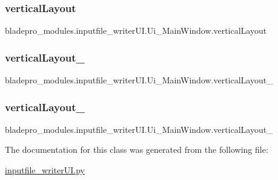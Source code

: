 \subsubsection{\texorpdfstring{vertical\+Layout}{verticalLayout}}
{\footnotesize\ttfamily bladepro\+\_\+modules.\+inputfile\+\_\+writer\+U\+I.\+Ui\+\_\+\+Main\+Window.\+vertical\+Layout}

\hypertarget{classbladepro__modules_1_1inputfile__writer_u_i_1_1_ui___main_window_af6dda5301b2c18cc6cb517d406371cd8}{}\label{classbladepro__modules_1_1inputfile__writer_u_i_1_1_ui___main_window_af6dda5301b2c18cc6cb517d406371cd8} 
\subsubsection{\texorpdfstring{vertical\+Layout\+\_}{verticalLayout\_2}}
{\footnotesize\ttfamily bladepro\+\_\+modules.\+inputfile\+\_\+writer\+U\+I.\+Ui\+\_\+\+Main\+Window.\+vertical\+Layout\+\_}

\hypertarget{classbladepro__modules_1_1inputfile__writer_u_i_1_1_ui___main_window_ab105030a0e14f15ea1514f18cd3202b7}{}\label{classbladepro__modules_1_1inputfile__writer_u_i_1_1_ui___main_window_ab105030a0e14f15ea1514f18cd3202b7} 
\subsubsection{\texorpdfstring{vertical\+Layout\+\_}{verticalLayout\_3}}
{\footnotesize\ttfamily bladepro\+\_\+modules.\+inputfile\+\_\+writer\+U\+I.\+Ui\+\_\+\+Main\+Window.\+vertical\+Layout\+\_}



The documentation for this class was generated from the following file\+:\begin{DoxyCompactItemize}
\item 
\hyperlink{inputfile__writer_u_i_8py}{inputfile\+\_\+writer\+U\+I.\+py}\end{DoxyCompactItemize}
